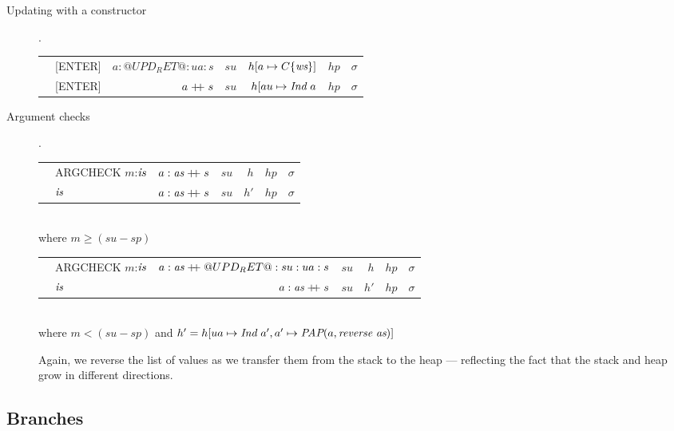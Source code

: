 \documentclass[11pt]{article}
\newcommand{\Subsection}[2]{\subsection{#1}\label{sec:#2}}
\begin{document}
\begin{description}

\item[ Updating with a constructor].

\begin{tabular}{|llrrrrr|}
\hline
	& [ENTER]	& $a : @UPD_RET@ : ua : s$ 	& $su$ & $h[a \mapsto C\{\mbox{\it ws}\}]$  & $hp$ & $\sigma$ \\
\next	& [ENTER]	& $a \mathrel{+\mkern-6mu+} s$ 		& $su$ & $h[au \mapsto {\mbox{\it Ind}\ {a}}$   & $hp$ & $\sigma$ \\
\hline
\end{tabular}

\item[ Argument checks].

\begin{tabular}{|llrrrrr|}
\hline
	& ARGCHECK $m$:$\mbox{\it is}$	& $a : \mbox{\it as} \mathrel{+\mkern-6mu+} s$ 	& $su$ & $h$ 	& $hp$ & $\sigma$ \\
\next	& $\mbox{\it is}$			& $a : \mbox{\it as} \mathrel{+\mkern-6mu+} s$ 	& $su$ & $h'$ 	& $hp$ & $\sigma$ \\
\hline
\end{tabular}
\\
where $m \ge (su - sp)$

\begin{tabular}{|llrrrrr|}
\hline
	& ARGCHECK $m$:$\mbox{\it is}$	& $a : \mbox{\it as} \mathrel{+\mkern-6mu+} @UPD_RET@:su:ua:s$ 	& $su$ & $h$ 	& $hp$ & $\sigma$ \\
\next	& $\mbox{\it is}$			& $a : \mbox{\it as} \mathrel{+\mkern-6mu+} s$ 			& $su$ & $h'$ 	& $hp$ & $\sigma$ \\
\hline
\end{tabular}
\\
where $m < (su - sp)$ and
      $h' = h[ua \mapsto {\mbox{\it Ind}\ {a'}}, a' \mapsto \mbox{\it PAP}(a,\mbox{\it reverse}\ \mbox{\it as}) ]$

Again, we reverse the list of values as we transfer them from the
stack to the heap --- reflecting the fact that the stack and heap grow
in different directions.

\end{description}

\Subsection{Branches}{hugs-branches}
\end{document}

